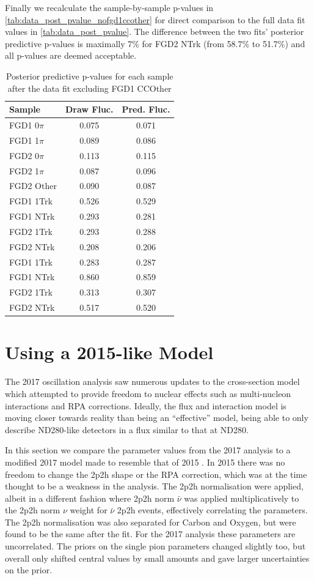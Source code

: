 Finally we recalculate the sample-by-sample p-values in \autoref{tab:data_post_pvalue_nofgd1ccother} for direct comparison to the full data fit values in \autoref{tab:data_post_pvalue}. The difference between the two fits' posterior predictive p-values is maximally 7\% for FGD2 NTrk (from 58.7\% to 51.7\%) and all p-values are deemed acceptable.
\begin{table}[h]
	\centering
	\begin{tabular}{l | c c }
		\hline \hline
		Sample & Draw Fluc. & Pred. Fluc. \\
		\hline
		FGD1 0$\pi$ & 0.075 & 0.071 \\
		FGD1 1$\pi$ & 0.089 & 0.086 \\
		FGD2 0$\pi$ & 0.113 & 0.115 \\
		FGD2 1$\pi$ & 0.087 & 0.096 \\
		FGD2 Other  & 0.090 & 0.087 \\
		\hline
		FGD1 1Trk & 0.526 & 0.529 \\
		FGD1 NTrk & 0.293 & 0.281 \\
		FGD2 1Trk & 0.293 & 0.288 \\
		FGD2 NTrk & 0.208 & 0.206 \\
		\hline
		FGD1 \numu 1Trk & 0.283 & 0.287 \\
		FGD1 \numu NTrk & 0.860 & 0.859 \\
		FGD2 \numu 1Trk & 0.313 & 0.307 \\
		FGD2 \numu NTrk & 0.517 & 0.520 \\
		\hline
		\hline
	\end{tabular}
	\caption{Posterior predictive p-values for each sample after the data fit excluding FGD1 CCOther}
	\label{tab:data_post_pvalue_nofgd1ccother}
\end{table}

\section{Using a 2015-like Model}
The 2017 oscillation analysis saw numerous updates to the cross-section model which attempted to provide freedom to nuclear effects such as multi-nucleon interactions and RPA corrections. Ideally, the flux and interaction model is moving closer towards reality than being an ``effective'' model, being able to only describe ND280-like detectors in a flux similar to that at ND280. 

In this section we compare the parameter values from the 2017 analysis to a modified 2017 model made to resemble that of 2015 \cite{t2k_2015}. In 2015 there was no freedom to change the 2p2h shape or the RPA correction, which was at the time thought to be a weakness in the analysis. The 2p2h normalisation were applied, albeit in a different fashion where 2p2h norm $\bar{\nu}$ was applied multiplicatively to the 2p2h norm $\nu$ weight for $\bar{\nu}$ 2p2h events, effectively correlating the parameters. The 2p2h normalisation was also separated for Carbon and Oxygen, but were found to be the same after the fit. For the 2017 analysis these parameters are uncorrelated. The priors on the single pion parameters changed slightly too, but overall only shifted central values by small amounts and gave larger uncertainties on the prior.

